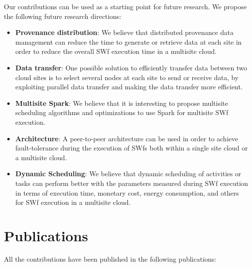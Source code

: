 Our contributions can be used as a starting point for future research. We propose the following future research directions:
\begin{itemize}
\item \textbf{Provenance distribution}: We believe that distributed provenance data management can reduce the time to generate or retrieve data at each site in order to reduce the overall SWf execution time in a multisite cloud. 
\item \textbf{Data transfer}: One possible solution to efficiently transfer data between two cloud sites is to select several nodes at each site to send or receive data, by exploiting parallel data transfer and making the data transfer more efficient. 
\item \textbf{Multisite Spark}: We believe that it is interesting to propose multisite scheduling algorithms and optimizations to use Spark for multisite SWf execution. 
\item \textbf{Architecture}: A peer-to-peer architecture can be used in order to achieve fault-tolerance during the execution of SWfs both within a single site cloud or a multisite cloud. 
\item \textbf{Dynamic Scheduling}: We believe that dynamic scheduling of activities or tasks can perform better with the parameters measured during SWf execution in terms of execution time, monetary cost, energy consumption, and others for SWf execution in a multisite cloud. 
\end{itemize}

\section*{Publications}

All the contributions have been published in the following publications:

